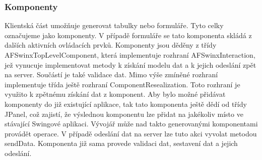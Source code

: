 \subsubsection{Komponenty}
Klientská část umožňuje generovat tabulky nebo formuláře. Tyto celky označujeme jako komponenty. V případě formuláře se tato komponenta skládá z dalších aktivních ovládacích prvků. Komponenty jsou děděny z třídy AFSwinxTopLevelComponent, která implementuje rozhraní AFSwinxInteraction, jež vynucuje implementovat metody k získání modelu dat a k jejich odeslání zpět na server. Součástí je také validace dat. Mimo výše zmíněné rozhraní implementuje třída ještě rozhraní ComponentResealization. Toto rozhraní je využito k zpětnému získání dat z komponent. Aby bylo možné přidávat komponenty do již existující aplikace, tak tato komponenta ještě dědí od třídy JPanel, což zajistí, že výslednou komponentu lze přidat na jakékoliv místo ve stávající Swingové aplikaci. Vývojář může nad takto generovanými komponentami provádět operace. V případě odeslání dat na server lze tuto akci vyvolat metodou sendData. Komponenta již sama provede validaci dat, sestavení dat a jejich odeslání.

